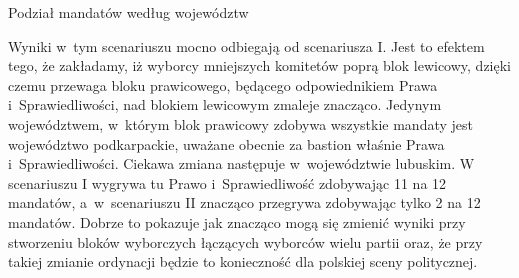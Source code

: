 \begin{table}[H]
\caption{Podział mandatów według województw}
\centering
{}
\caption*{Źródło: własne}
\end{table}

Wyniki w~tym scenariuszu mocno odbiegają od scenariusza I. Jest to efektem tego, że zakładamy, iż wyborcy mniejszych komitetów poprą blok lewicowy, dzięki czemu przewaga bloku prawicowego, będącego odpowiednikiem Prawa i~Sprawiedliwości, nad blokiem lewicowym zmaleje znacząco. Jedynym województwem, w~którym blok prawicowy zdobywa wszystkie mandaty jest województwo podkarpackie, uważane obecnie za bastion właśnie Prawa i~Sprawiedliwości. Ciekawa zmiana następuje w~województwie lubuskim. W scenariuszu I wygrywa tu Prawo i~Sprawiedliwość zdobywając 11 na 12 mandatów, a~w~scenariuszu II znacząco przegrywa zdobywając tylko 2 na 12 mandatów. Dobrze to pokazuje jak znacząco mogą się zmienić wyniki przy stworzeniu bloków wyborczych łączących wyborców wielu partii oraz, że przy takiej zmianie ordynacji będzie to konieczność dla polskiej sceny politycznej.